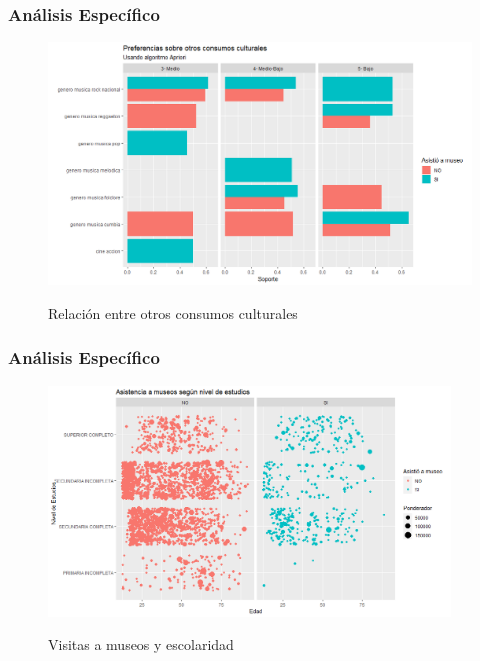 \documentclass[10pt]{beamer}
\begin{document}
  \begin{frame}
    \frametitle{Análisis Específico}

  
    \begin{figure}
      \includegraphics[width=\textwidth]{itemsets.png}
      \label{fig:itemsets}
      \caption{Relación entre otros consumos culturales}
      \end{figure}
    \end{frame}

    \begin{frame}
      \frametitle{Análisis Específico}
      \begin{figure}
        \includegraphics[width=0.95\textwidth]{nivel_estudios.png}
        \label{fig:nivel_estudios}
        \caption{Visitas a museos y escolaridad}
        \end{figure}
      \end{frame}
    
\end{document}
